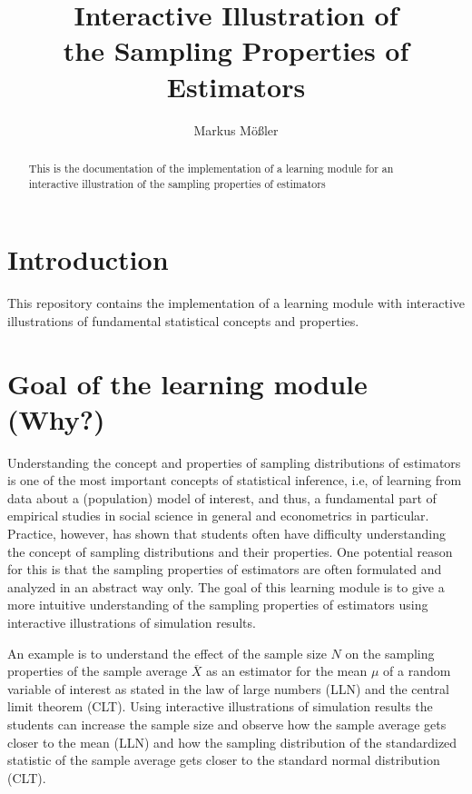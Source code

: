 \documentclass{article}
\title{Interactive Illustration of \\ the Sampling Properties of \\ Estimators}
\author{Markus M\"o\ss ler}
\begin{document}
	
\maketitle
	
\begin{abstract}
This is the documentation of the implementation of a learning module for an interactive illustration of the sampling properties of estimators
\end{abstract}

\section{Introduction}

This repository contains the implementation of a learning module with interactive illustrations of fundamental statistical concepts and properties.

\section{Goal of the learning module (Why?)}

Understanding the concept and properties of sampling distributions of estimators is one of the most important concepts of statistical inference, i.e, of learning from data about a (population) model of interest, and thus, a fundamental part of empirical studies in social science in general and econometrics in particular. 
%
Practice, however, has shown that students often have difficulty understanding the concept of sampling distributions and their properties. 
%
One potential reason for this is that the sampling properties of estimators are often formulated and analyzed in an abstract way only. 
%
The goal of this learning module is to give a more intuitive understanding of the sampling properties of estimators using interactive illustrations of simulation results. 

An example is to understand the effect of the sample size $N$ on the sampling properties of the sample average $\overline{X}$ as an estimator for the mean $\mu$ of a random variable of interest as stated in the law of large numbers (LLN) and the central limit theorem (CLT). 
%
Using interactive illustrations of simulation results the students can increase the sample size and observe how the sample average gets closer to the mean (LLN) and how the sampling distribution of the standardized statistic of the sample average gets closer to the standard normal distribution (CLT).
\end{document}
